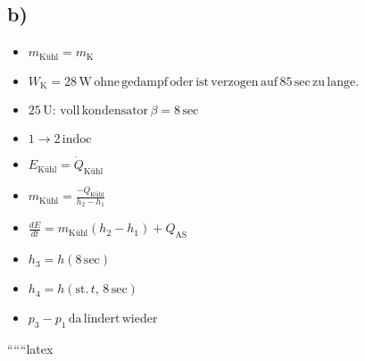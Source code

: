 

\subsection*{b)}

\begin{itemize}
    \item $m_{\text{Kühl}} = m_{\text{K}}$
    \item $W_{\text{K}} = 28 \, \text{W} \, \text{ohne} \, \text{gedampf} \, \text{oder} \, \text{ist} \, \text{verzogen} \, \text{auf} \, 85 \, \text{sec} \, \text{zu} \, \text{lange}.$
    \item $25 \, \text{U}: \, \text{voll} \, \text{kondensator} \, \beta = 8 \, \text{sec}$
    \item $1 \rightarrow 2 \, \text{indoc}$
    \item $E_{\text{Kühl}} = \dot{Q}_{\text{Kühl}}$
    \item $m_{\text{Kühl}} = \frac{-Q_{\text{Kühl}}}{h_2 - h_1}$
    \item $\frac{dE}{dt} = m_{\text{Kühl}} (h_2 - h_1) + Q_{\text{AS}}$
    \item $h_3 = h(8 \, \text{sec})$
    \item $h_4 = h(\text{st.} \, t, \, 8 \, \text{sec})$
    \item $p_3 - p_1 \, \text{da} \, \text{lindert} \, \text{wieder}$
\end{itemize}

``````latex